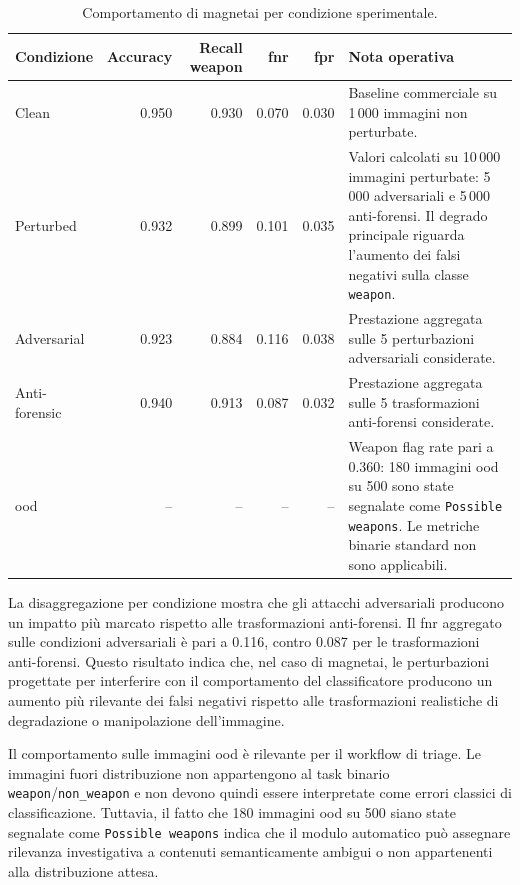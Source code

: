 \begin{table}[H]
\centering
\caption{Comportamento di \gls{magnetai} per condizione sperimentale.}
\label{tab:results-magnet-condition-metrics}
\small
\begin{tabularx}{\textwidth}{@{}l r r r r X@{}}
\toprule
\textbf{Condizione} &
\textbf{Accuracy} &
\textbf{Recall weapon} &
\textbf{\gls{fnr}} &
\textbf{\gls{fpr}} &
\textbf{Nota operativa} \\
\midrule

Clean &
0.950 &
0.930 &
0.070 &
0.030 &
Baseline commerciale su 1\,000 immagini non perturbate. \\

Perturbed &
0.932 &
0.899 &
0.101 &
0.035 &
Valori calcolati su 10\,000 immagini perturbate: 5\,000 adversariali e 5\,000
anti-forensi. Il degrado principale riguarda l'aumento dei falsi negativi sulla
classe \texttt{weapon}. \\

Adversarial &
0.923 &
0.884 &
0.116 &
0.038 &
Prestazione aggregata sulle 5 perturbazioni adversariali considerate. \\

Anti-forensic &
0.940 &
0.913 &
0.087 &
0.032 &
Prestazione aggregata sulle 5 trasformazioni anti-forensi considerate. \\

\gls{ood} &
-- &
-- &
-- &
-- &
Weapon flag rate pari a 0.360: 180 immagini \gls{ood} su 500 sono state
segnalate come \texttt{Possible weapons}. Le metriche binarie standard non sono
applicabili. \\

\bottomrule
\end{tabularx}
\end{table}

La disaggregazione per condizione mostra che gli attacchi adversariali producono
un impatto più marcato rispetto alle trasformazioni anti-forensi. Il \gls{fnr}
aggregato sulle condizioni adversariali è pari a 0.116, contro 0.087 per le
trasformazioni anti-forensi. Questo risultato indica che, nel caso di
\gls{magnetai}, le perturbazioni progettate per interferire con il comportamento
del classificatore producono un aumento più rilevante dei falsi negativi rispetto
alle trasformazioni realistiche di degradazione o manipolazione dell'immagine.

Il comportamento sulle immagini \gls{ood} è rilevante per il workflow di triage.
Le immagini fuori distribuzione non appartengono al task binario
\texttt{weapon}/\texttt{non\_weapon} e non devono quindi essere interpretate come
errori classici di classificazione. Tuttavia, il fatto che 180 immagini
\gls{ood} su 500 siano state segnalate come \texttt{Possible weapons} indica che
il modulo automatico può assegnare rilevanza investigativa a contenuti
semanticamente ambigui o non appartenenti alla distribuzione attesa.

